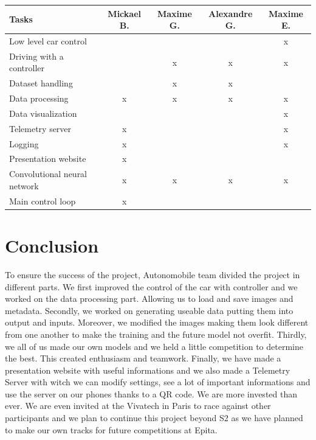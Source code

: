 \documentclass[12pt]{article}
\begin{document}
\begin{tabular}{|l|c|c|c|c|} 
\hline
Tasks                        & Mickael B. & Maxime G. & Alexandre G. & Maxime E.  \\ 
\hline
Low level car control        &            &           &              & x          \\ 
\hline
Driving with a controller    &            & x         & x            & x          \\ 
\hline
Dataset handling             &            & x         & x            &            \\ 
\hline
Data processing              & x          & x         & x            & x          \\ 
\hline
Data visualization           &            &           &              & x          \\ 
\hline
Telemetry server             & x          &           &              & x          \\ 
\hline
Logging                      & x          &           &              & x          \\ 
\hline
Presentation website         & x          &           &              &            \\ 
\hline
Convolutional neural network & x          & x         & x            & x          \\ 
\hline
Main control loop            & x          &           &              &            \\
\hline
\end{tabular}

\section {Conclusion}
 To ensure the success of the project, Autonomobile team divided the project in different parts. We first improved the control of the car with controller and we worked on the data processing part. Allowing us to load and save images and metadata. Secondly, we worked on generating useable data putting them into output and inputs. Moreover, we modified the images making them look different from one another to make the training and the future model not overfit. Thirdly, we all of us made our own models and we held a little competition to determine the best. This created enthusiasm and teamwork. Finally, we have made a presentation website with useful informations and we also made a Telemetry Server with witch we can modify settings, see a lot of important informations and use the server on our phones thanks to a QR code. We are more invested than ever. We are even invited at the Vivatech in Paris to race against other participants and we plan to continue this project beyond S2 as we have planned to make our own tracks for future competitions at Epita.
\end{document}
